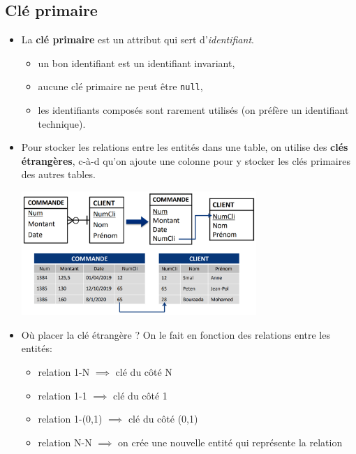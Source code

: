 \documentclass[a4paper]{article}
\begin{document}
\subsection{Clé primaire}





\begin{itemize}



\item La \textbf{clé primaire} est un attribut qui sert d'\textit{identifiant}.
\begin{itemize}
    \item un bon identifiant est un identifiant invariant,
    \item aucune clé primaire ne peut être \texttt{null},
    \item les identifiants composés sont rarement utilisés (on préfère un identifiant technique).
\end{itemize}



\item Pour stocker les relations entre les entités dans une table, on utilise des \textbf{clés étrangères}, c-à-d qu'on ajoute une colonne pour y stocker les clés primaires des autres tables.
\begin{center}
    \includegraphics[width=0.70\textwidth]{../images/table02.PNG}
\end{center}



\item Où placer la clé étrangère ? On le fait en fonction des relations entre les entités:
\begin{itemize}
    \item relation 1-N $ \implies $ clé du côté N
    \item relation 1-1 $ \implies $ clé du côté 1
    \item relation 1-(0,1) $ \implies $ clé du côté (0,1)
    \item relation N-N $ \implies $ on crée une nouvelle entité qui représente la relation
\end{itemize}



\end{itemize}
\end{document}
